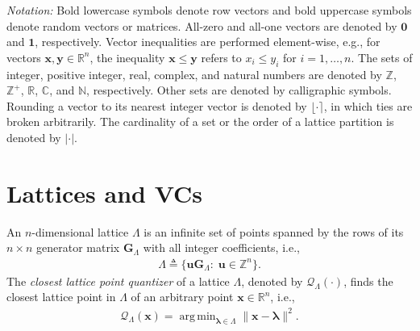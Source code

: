 \documentclass[journal]{IEEEtran}
\newcommand{\R}{\mathbb{R}}
\newcommand{\Z}{\mathbb{Z}}
\newcommand{\Q}{\mathcal{Q}}
\newcommand{\bu}{\boldsymbol{u}}
\newcommand{\bx}{\boldsymbol{x}}
\newcommand{\by}{\boldsymbol{y}}
\newcommand{\bG}{\boldsymbol{G}}
\newcommand{\bzero}{\boldsymbol{0}}
\newcommand{\bone}{\boldsymbol{1}}
\newcommand{\blambda}{\boldsymbol{\lambda}}
\DeclareMathOperator*{\argmin}{arg\,min} %
\begin{document}


\emph{Notation:} Bold lowercase symbols denote row vectors and bold uppercase symbols denote random vectors or matrices. All-zero and all-one vectors are denoted by $\bzero$ and $\bone$, respectively. Vector inequalities are performed element-wise, e.g., for vectors $\bx,\by\in\R^n$, the inequality $\bx\leq\by$ refers to $x_i\leq y_i$ for $i=1,\ldots,n$. The sets of integer, positive integer, real, complex, and natural numbers are denoted by $\Z$, $\Z^+$, $\R$, $\mathbb{C}$, and $\mathbb{N}$, respectively. Other sets are denoted by calligraphic symbols. Rounding a vector to its nearest integer vector is denoted by $\lfloor \cdot \rceil$, in which ties are broken arbitrarily. The cardinality of a set or the order of a lattice partition is denoted by $|\cdot|$.




\section{Lattices and VCs}
An $n$-dimensional lattice $\Lambda$ is an infinite set of points spanned by the rows of its $n\times n$ generator matrix $\bG_{\Lambda}$ with all integer coefficients, i.e.,
\begin{align}
\Lambda \triangleq \{ \bu \bG_{\Lambda} :\; \bu \in \Z^n \}
.\label{eq:lattice_defination}\end{align}
The \emph{closest lattice point quantizer} of a lattice $\Lambda$, denoted by $\Q_{\Lambda}(\cdot)$, finds the closest lattice point in $\Lambda$ of an arbitrary point $\bx\in\R^n$, i.e.,
\begin{align}
    \Q_{\Lambda}(\bx)=\argmin_{\blambda \in \Lambda}\|\bx-\blambda\|^2.
\end{align}
\end{document}
